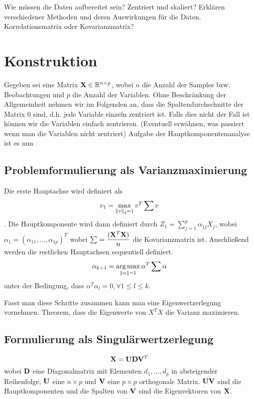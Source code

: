Wie müssen die Daten aufbereitet sein? Zentriert und skaliert? Erklären verschiedener Methoden und deren Auswirkungen für die Daten. Korrelationsmatrix oder Kovarianzmatrix?




\section{Konstruktion}

Gegeben sei eine Matrix $\mathbf{X} \in \mathbb{R}^{n\times p}$, wobei $n$ die Anzahl der Samples bzw. Beobachtungen und $p$ die Anzahl der Variablen. Ohne Beschränkung der Allgemeinheit nehmen wir im Folgenden an, dass die Spaltendurchschnitte der Matrix 0 sind, d.h. jede Variable einzeln zentriert ist. Falls dies nicht der Fall ist können wir die Variablen einfach zentrieren. (Eventuell erwähnen, was passiert wenn man die Variablen nicht zentriert)
Aufgabe der Hauptkomponentenanalyse ist es nun

\subsection{Problemformulierung als Varianzmaximierung}
Die erste Hauptachse wird definiert als $$v_1 = \max_{\left\lVert v \right\rVert_2 = 1} v^T \sum v$$. Die Hauptkomponente wird dann definiert durch $Z_1 = \sum_{j=1}^{p} \alpha_{1j}X_j$, wobei $\alpha_1 = (\alpha_{11}, \ldots, \alpha_{1p})^T$
wobei $\sum = \dfrac{(\mathbf{X}^T\mathbf{X})}{n}$ die Kovarianzmatrix ist. Anschließend werden die restlichen Hauptachsen sequentiell definiert.
$$\alpha_{k+1} = \operatorname*{arg\,max}_{\left\lVert \alpha \right\rVert = 1} \alpha^T\sum\alpha$$ unter der Bedingung, dass $\alpha^T\alpha_l = 0, \forall 1 \leq l \leq k$.

\cite{zou_overview}

Fasst man diese Schritte zusammen kann man eine Eigenwertzerlegung vornehmen. Theorem, dass die Eigenwerte von $X^TX$ die Varianz maximieren.

\subsection{Formulierung als Singulärwertzerlegung}
$$ \mathbf{X} = \mathbf{U}\mathbf{D}\mathbf{V}^T $$
wobei $\mathbf{D}$ eine Diagonalmatrix mit Elementen $d_1,\ldots,d_p$ in absteigender Reihenfolge, $\mathbf{U}$ eine $n \times p$ und $\mathbf{V}$ eine $p \times p$ orthogonale Matrix.
$\mathbf{U}\mathbf{V}$ sind die Hauptkomponenten und die Spalten von $\mathbf{V}$ sind die Eigenvektoren von $\mathbf{X}$.

